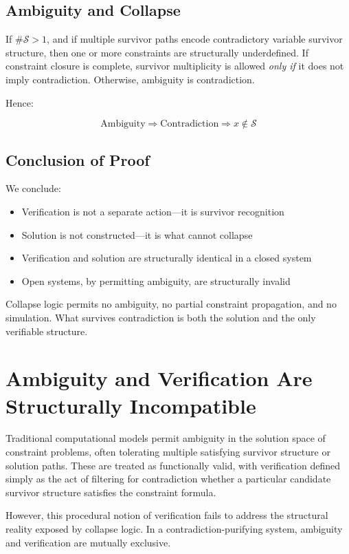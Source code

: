 \documentclass[12pt]{article}
\begin{document}
\subsection{Ambiguity and Collapse}

If $\#\mathcal{S} > 1$, and if multiple survivor paths encode contradictory variable survivor structure, then one or more constraints are structurally underdefined. If constraint closure is complete, survivor multiplicity is allowed \textit{only if} it does not imply contradiction. Otherwise, ambiguity is contradiction.

Hence:

\[
\text{Ambiguity} \Rightarrow \text{Contradiction} \Rightarrow x \notin \mathcal{S}
\]

\subsection{Conclusion of Proof}

We conclude:

\begin{itemize}
  \item Verification is not a separate action—it is survivor recognition
  \item Solution is not constructed—it is what cannot collapse
  \item Verification and solution are structurally identical in a closed system
  \item Open systems, by permitting ambiguity, are structurally invalid
\end{itemize}

Collapse logic permits no ambiguity, no partial constraint propagation, and no simulation. What survives contradiction is both the solution and the only verifiable structure.


\section{Ambiguity and Verification Are Structurally Incompatible}

Traditional computational models permit ambiguity in the solution space of constraint problems, often tolerating multiple satisfying survivor structure or solution paths. These are treated as functionally valid, with verification defined simply as the act of filtering for contradiction whether a particular candidate survivor structure satisfies the constraint formula.

However, this procedural notion of verification fails to address the structural reality exposed by collapse logic. In a contradiction-purifying system, ambiguity and verification are mutually exclusive.
\end{document}
